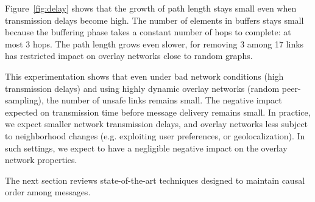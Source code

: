 \noindent Figure~\ref{fig:delay} shows that the growth of path length stays small
  even when transmission delays become high. The number of elements in buffers
  stays small because the buffering phase takes a constant number of hops to
  complete: at most 3 hops. The path length grows even slower, for removing 3
  among 17 links has restricted impact on overlay networks close to random
  graphs.

This experimentation shows that even under bad network conditions (high
transmission delays) and using highly dynamic overlay networks (random
peer-sampling), the number of unsafe links remains small. The negative impact
expected on transmission time before message delivery remains small. In
practice, we expect smaller network transmission delays, and overlay networks
less subject to neighborhood changes (e.g. exploiting user preferences, or
geolocalization). In such settings, we expect \CBROADCAST to have a negligible
negative impact on the overlay network properties.

The next section reviews state-of-the-art techniques designed to maintain causal
order among messages.

